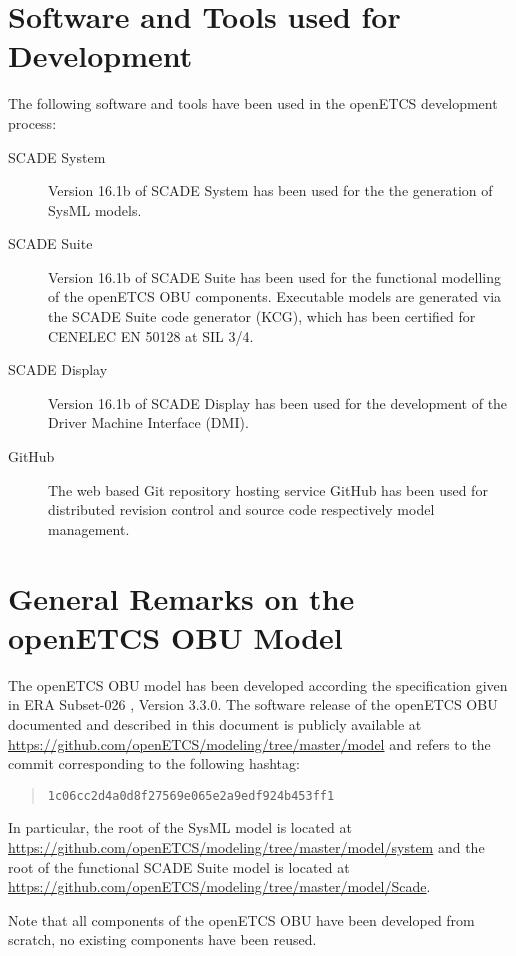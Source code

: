 \section{Software and Tools used for Development}

The following software and tools have been used in the openETCS development process:
\begin{description}
\item[SCADE System] Version 16.1b of SCADE System has been used for the the generation of SysML models.
\item[SCADE Suite] Version 16.1b of SCADE Suite has been used for the functional modelling of the openETCS OBU components. Executable models are generated via the SCADE Suite code generator (KCG), which has been certified for CENELEC EN 50128 at SIL 3/4.
\item[SCADE Display] Version 16.1b of SCADE Display has been used for the development of the Driver Machine Interface (DMI).
\item[GitHub] The web based Git repository hosting service GitHub has been used for distributed revision control and source code respectively model management.
\end{description}


\section{General Remarks on the openETCS OBU Model}
The openETCS OBU model has been developed according the specification given in ERA Subset-026 \cite{subset-026}, Version 3.3.0. The software release of the openETCS OBU documented and described in this document is publicly available at \url{https://github.com/openETCS/modeling/tree/master/model} and refers to the commit corresponding to the following hashtag:
\begin{quotation}
\centering
{}
\texttt{1c06cc2d4a0d8f27569e065e2a9edf924b453ff1}
\end{quotation}
In particular, the root of the SysML model is located at
\url{https://github.com/openETCS/modeling/tree/master/model/system}
and the root of the functional SCADE Suite model is located at
\url{https://github.com/openETCS/modeling/tree/master/model/Scade}.

Note that all components of the openETCS OBU have been developed from scratch, no existing components have been reused.